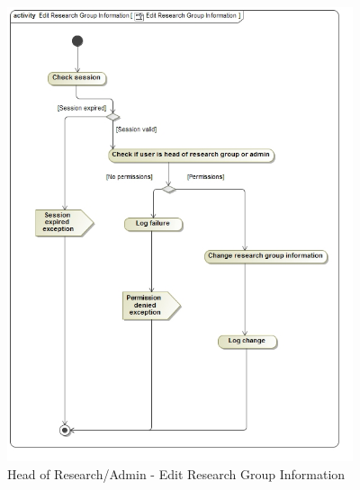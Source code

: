 \documentclass{article}
\begin{document}
				\begin{figure}[H]
					\includegraphics[width=4in, center]{../Diagrams/Process Specifications/Group control subsystem/Edit Research Group Information.jpg}
					\caption{Head of Research/Admin - Edit Research Group Information}
				\end{figure}
\end{document}
